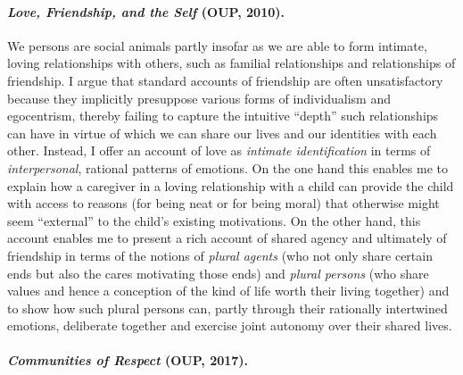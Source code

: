 \documentclass[%
  11pt,%
]{article}
\begin{document}
\paragraph{\emph{Love, Friendship, and the Self} (OUP, 2010).}

We persons are social animals partly insofar as we are able to form intimate, loving relationships with others, such as familial relationships and relationships of friendship. I argue that standard accounts of friendship are often unsatisfactory because they implicitly presuppose various forms of individualism and egocentrism, thereby failing to capture the intuitive \enquote{depth} such relationships can have in virtue of which we can share our lives and our identities with each other. Instead, I offer an account of love as \emph{intimate identification} in terms of \emph{interpersonal}, rational patterns of emotions. On the one hand this enables me to explain how a caregiver in a loving relationship with a child can provide the child with access to reasons (for being neat or for being moral) that otherwise might seem \enquote{external} to the child's existing motivations. On the other hand, this account enables me to present a rich account of shared agency and ultimately of friendship in terms of the notions of \emph{plural agents} (who not only share certain ends but also the cares motivating those ends) and \emph{plural persons} (who share values and hence a conception of the kind of life worth their living together) and to show how such plural persons can, partly through their rationally intertwined emotions, deliberate together and exercise joint autonomy over their shared lives.

\paragraph{\emph{Communities of Respect} (OUP, 2017).}
\end{document}
